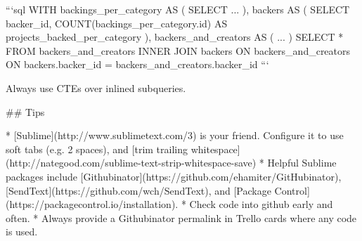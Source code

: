 ```sql
WITH backings_per_category AS (
  SELECT
    ...
), backers AS (
  SELECT
    backer_id,
    COUNT(backings_per_category.id) AS projects_backed_per_category
), backers_and_creators AS (
  ...
)
SELECT * FROM backers_and_creators
INNER JOIN backers ON backers_and_creators ON backers.backer_id = backers_and_creators.backer_id
```

Always use CTEs over inlined subqueries.

## Tips

* [Sublime](http://www.sublimetext.com/3) is your friend. Configure it to use soft tabs (e.g. 2 spaces), and [trim trailing whitespace](http://nategood.com/sublime-text-strip-whitespace-save)
* Helpful Sublime packages include [Githubinator](https://github.com/ehamiter/GitHubinator), [SendText](https://github.com/wch/SendText), and [Package Control](https://packagecontrol.io/installation).
* Check code into github early and often.
* Always provide a Githubinator permalink in Trello cards where any code is used.
